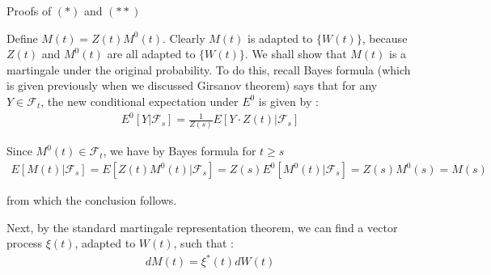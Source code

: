\documentclass{beamer}
\begin{document}
\begin{frame}{Proofs of $(*)$ and $(**)$}

    {\footnotesize \footnotesize
   
    \par Define $M(t) = Z(t) M^0(t)$. Clearly \(M(t)\) is adapted to \(\{W(t)\}\), because \(Z(t)\) and \(M^0(t)\) are 
    all adapted to \(\{W(t)\}\). We shall show that \(M(t)\) is a martingale under the original probability. To do this, recall Bayes formula (which is given previously when we discussed Girsanov theorem) 
    says that for any \( Y \in \mathcal{F}_t \), the new conditional expectation under \( E^0 \) is given by  :
    \begin{align*}
        E^0 [Y | \mathcal{F}_s] = \frac{1}{Z(s)} E[Y \cdot Z(t) | \mathcal{F}_s]
    \end{align*}
    \par  \pause Since \( M^0(t) \in \mathcal{F}_t \), we have by Bayes formula for \( t \geq s \)  
    \begin{align*}
        E[M(t) | \mathcal{F}_s] = E[Z(t)M^0(t) | \mathcal{F}_s] = Z(s)E^0[M^0(t) | \mathcal{F}_s] = Z(s)M^0(s) = M(s)
    \end{align*}
    \par from which the conclusion follows.  
    \par Next, by the standard martingale representation theorem, we can find a vector process \( \xi(t) \), adapted to \( W(t) \), such that :
    \begin{align*}
        dM(t) = \xi^*(t) dW(t)
    \end{align*}
   
    }

\end{frame}
\end{document}
